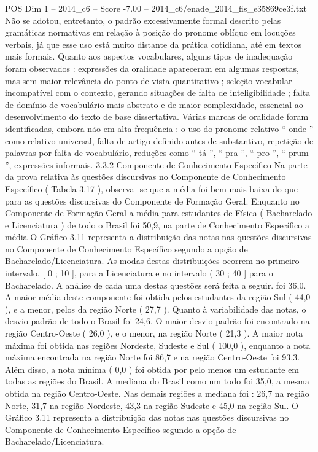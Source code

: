 \begin{textsample}{POS Dim 1 – 2014\_c6 – Score -7.00 – 2014\_c6/enade\_2014\_fis\_e35869ce3f.txt}
Não se adotou, entretanto, o padrão excessivamente formal descrito pelas gramáticas normativas em relação à posição do pronome oblíquo em locuções verbais, já que esse uso está muito distante da prática cotidiana, até em textos mais formais.
Quanto aos aspectos vocabulares, alguns tipos de inadequação foram observados : expressões da oralidade apareceram em algumas respostas, mas sem maior relevância do ponto de vista quantitativo ; seleção vocabular incompatível com o contexto, gerando situações de falta de inteligibilidade ; falta de domínio de vocabulário mais abstrato e de maior complexidade, essencial ao desenvolvimento do texto de base dissertativa.
Várias marcas de oralidade foram identificadas, embora não em alta frequência : o uso do pronome relativo “ onde ” como relativo universal, falta de artigo definido antes de substantivo, repetição de palavras por falta de vocabulário, reduções como “ tá ”, “ pra ”, “ pro ”, “ prum ”, expressões informais. 3.3.2 Componente de Conhecimento Específico Na parte da prova relativa às questões discursivas no Componente de Conhecimento Específico ( Tabela 3.17 ), observa -se que a média foi bem mais baixa do que para as questões discursivas do Componente de Formação Geral.
Enquanto no Componente de Formação Geral a média para estudantes de Física ( Bacharelado e Licenciatura ) de todo o Brasil foi 50,9, na parte de Conhecimento Específico a média O Gráfico 3.11 representa a distribuição das notas nas questões discursivas no Componente de Conhecimento Específico segundo a opção de Bacharelado/Licenciatura.
As modas destas distribuições ocorrem no primeiro intervalo, [ 0 ; 10 ], para a Licenciatura e no intervalo ( 30 ; 40 ] para o Bacharelado.
A análise de cada uma destas questões será feita a seguir. foi 36,0.
A maior média deste componente foi obtida pelos estudantes da região Sul ( 44,0 ), e a menor, pelos da região Norte ( 27,7 ).
Quanto à variabilidade das notas, o desvio padrão de todo o Brasil foi 24,6.
O maior desvio padrão foi encontrado na região Centro-Oeste ( 26,0 ), e o menor, na região Norte ( 21,3 ).
A maior nota máxima foi obtida nas regiões Nordeste, Sudeste e Sul ( 100,0 ), enquanto a nota máxima encontrada na região Norte foi 86,7 e na região Centro-Oeste foi 93,3.
Além disso, a nota mínima ( 0,0 ) foi obtida por pelo menos um estudante em todas as regiões do Brasil.
A mediana do Brasil como um todo foi 35,0, a mesma obtida na região Centro-Oeste.
Nas demais regiões a mediana foi : 26,7 na região Norte, 31,7 na região Nordeste, 43,3 na região Sudeste e 45,0 na região Sul.
O Gráfico 3.11 representa a distribuição das notas nas questões discursivas no Componente de Conhecimento Específico segundo a opção de Bacharelado/Licenciatura.

\end{textsample}
